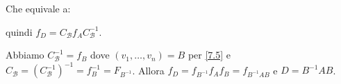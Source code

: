 \documentclass[a4paper]{article}
\theoremstyle{break}
\theoremstyle{break}
\theoremstyle{break}
\theoremstyle{break}
\begin{document}
\begin{figure}[H]
  \centering
  
\end{figure}
\noindent Che equivale a:
\begin{figure}[H]
  \centering
\end{figure}
\noindent quindi \( f_{D} = C_{\mathcal{B}} f_A C_{\mathcal{B}}^{-1} \).

\noindent Abbiamo \( C_{\mathcal{B}}^{-1} = f_B \) dove \( (v_1, \ldots, v_n) = B \) per
\ref{7.5} e \( C_{\mathcal{B}} = (C_{\mathcal{B}}^{-1})^{-1} = f_B^{-1} = F_{B^{-1}} \).
Allora \( f_D = f_{B^{-1}} f_A f_B = f_{B^{-1}AB} \) e \( D = B^{-1}AB \).
\end{document}
